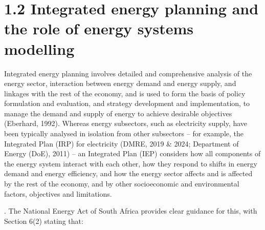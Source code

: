 \documentclass[letterpaper,10pt,english]{jupyterBook}
\begin{document}
\section{1.2 Integrated energy planning and the role of energy systems modelling}
\label{\detokenize{01Introduction:integrated-energy-planning-and-the-role-of-energy-systems-modelling}}
\sphinxAtStartPar
Integrated energy planning involves detailed and comprehensive analysis of the energy sector, interaction between energy demand and energy supply, and linkages with the rest of the economy, and is used to form the basis of policy formulation and evaluation, and strategy development and implementation, to manage the demand and supply of energy to achieve desirable objectives (Eberhard, 1992). Whereas energy subsectors, such as electricity supply, have been typically analysed in isolation from other subsectors – for example, the Integrated  Plan (IRP) for electricity (DMRE, 2019 \& 2024; Department of Energy (DoE), 2011) – an Integrated  Plan (IEP) considers how all components of the energy system interact with each other, how they respond to shifts in energy demand and energy efficiency, and how the energy sector affects and is affected by the rest of the economy, and by other socio\sphinxhyphen{}economic and environmental factors, objectives and limitations.

\sphinxAtStartPar
{}. The National Energy Act of South Africa provides clear guidance for this, with Section 6(2) stating that:
\end{document}
